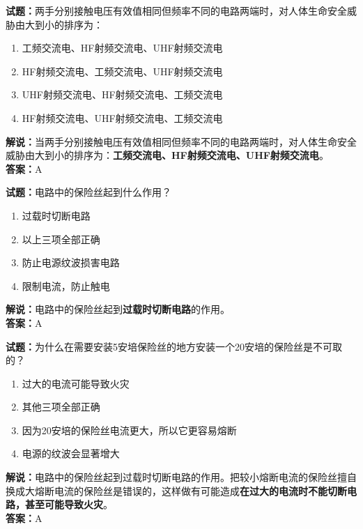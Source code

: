 \documentclass{ctexbook}
\begin{document}
\vspace{1em}

\textbf{试题：}两手分别接触电压有效值相同但频率不同的电路两端时，对人体生命安全威胁由大到小的排序为：
\begin{enumerate}[leftmargin=3em]
  \item 工频交流电、HF射频交流电、UHF射频交流电
  \item HF射频交流电、工频交流电、UHF射频交流电
  \item UHF射频交流电、HF射频交流电、工频交流电
  \item HF射频交流电、UHF射频交流电、工频交流电
\end{enumerate}
\noindent\textbf{解说：}当两手分别接触电压有效值相同但频率不同的电路两端时，对人体生命安全威胁由大到小的排序为：\textbf{工频交流电、HF射频交流电、UHF射频交流电}。\\\noindent\textbf{答案：}A

\vspace{1em}

\textbf{试题：}电路中的保险丝起到什么作用？
\begin{enumerate}[leftmargin=3em]
  \item 过载时切断电路
  \item 以上三项全部正确
  \item 防止电源纹波损害电路
  \item 限制电流，防止触电
\end{enumerate}
\noindent\textbf{解说：}电路中的保险丝起到\textbf{过载时切断电路}的作用。\\\noindent\textbf{答案：}A

\vspace{1em}

\textbf{试题：}为什么在需要安装5安培保险丝的地方安装一个20安培的保险丝是不可取的？
\begin{enumerate}[leftmargin=3em]
  \item 过大的电流可能导致火灾
  \item 其他三项全部正确
  \item 因为20安培的保险丝电流更大，所以它更容易熔断
  \item 电源的纹波会显著增大
\end{enumerate}
\noindent\textbf{解说：}电路中的保险丝起到过载时切断电路的作用。把较小熔断电流的保险丝擅自换成大熔断电流的保险丝是错误的，这样做有可能造成\textbf{在过大的电流时不能切断电路，甚至可能导致火灾}。\\\noindent\textbf{答案：}A

\vspace{1em}
\end{document}
